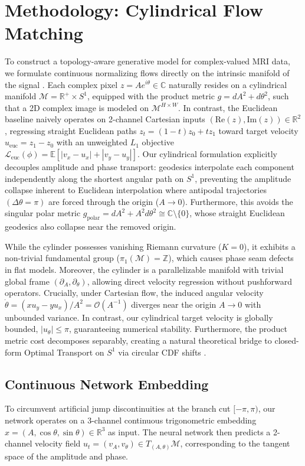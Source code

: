 \section{Methodology: Cylindrical Flow Matching}
\label{sec:method}

To construct a topology-aware generative model for complex-valued MRI data, we formulate continuous normalizing flows directly on the intrinsic manifold of the signal \citep{lipman2023flow, chen2024flow}. Each complex pixel $z = A e^{i\theta} \in \mathbb{C}$ naturally resides on a cylindrical manifold $\mathcal{M} = \mathbb{R}^+ \times S^1$, equipped with the product metric $g = dA^2 + d\theta^2$, such that a 2D complex image is modeled on $\mathcal{M}^{H \times W}$. In contrast, the Euclidean baseline naively operates on 2-channel Cartesian inputs $(\mathrm{Re}(z), \mathrm{Im}(z)) \in \mathbb{R}^2$, regressing straight Euclidean paths $z_t = (1-t)z_0 + t z_1$ toward target velocity $u_{\mathrm{euc}} = z_1 - z_0$ with an unweighted $L_1$ objective $\mathcal{L}_{\mathrm{euc}}(\phi) = \mathbb{E}[|v_x - u_x| + |v_y - u_y|]$. Our cylindrical formulation explicitly decouples amplitude and phase transport: geodesics interpolate each component independently along the shortest angular path on $S^1$, preventing the amplitude collapse inherent to Euclidean interpolation where antipodal trajectories $(\Delta\theta = \pi)$ are forced through the origin ($A \to 0$). Furthermore, this avoids the singular polar metric $g_{\mathrm{polar}} = dA^2 + A^2 d\theta^2 \cong \mathbb{C} \setminus \{0\}$, whose straight Euclidean geodesics also collapse near the removed origin.

While the cylinder possesses vanishing Riemann curvature ($K=0$), it exhibits a non-trivial fundamental group ($\pi_1(\mathcal{M}) = \mathbb{Z}$), which causes phase seam defects in flat models. Moreover, the cylinder is a parallelizable manifold with trivial global frame $(\partial_A, \partial_\theta)$, allowing direct velocity regression without pushforward operators. Crucially, under Cartesian flow, the induced angular velocity $\dot{\theta} = (x u_y - y u_x) / A^2 = \mathcal{O}(A^{-1})$ diverges near the origin $A \to 0$ with unbounded variance. In contrast, our cylindrical target velocity is globally bounded, $|u_\theta| \le \pi$, guaranteeing numerical stability. Furthermore, the product metric cost decomposes separably, creating a natural theoretical bridge to closed-form Optimal Transport on $S^1$ via circular CDF shifts \citep{delon2010fast}.

\subsection{Continuous Network Embedding}
To circumvent artificial jump discontinuities at the branch cut $[-\pi, \pi)$, our network operates on a 3-channel continuous trigonometric embedding $x = (A, \cos\theta, \sin\theta) \in \mathbb{R}^3$ as input. The neural network then predicts a 2-channel velocity field $u_t = (v_A, v_\theta) \in T_{(A, \theta)}\mathcal{M}$, corresponding to the tangent space of the amplitude and phase.

